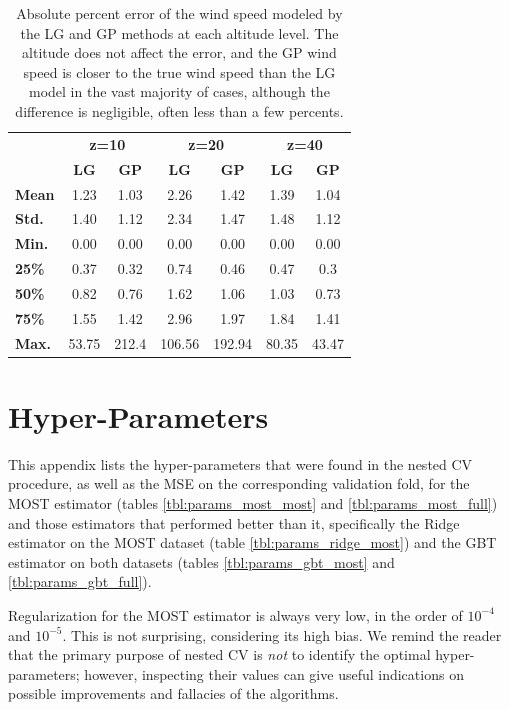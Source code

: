 \documentclass[a4paper,11pt]{kth-mag}
\begin{document}
\begin{table}[]
\centering
\caption{Absolute percent error of the wind speed modeled by the LG and GP methods at each altitude level. The altitude does not affect the error, and the GP wind speed is closer to the true wind speed than the LG model in the vast majority of cases, although the difference is negligible, often less than a few percents.}
\label{tbl:model_wind_errors}
\begin{tabular*}{\textwidth}{l |@{\extracolsep{\fill}} cc|cc|cc}
\toprule
& \multicolumn{2}{c|}{ \textbf{z=10} } & \multicolumn{2}{c|}{ \textbf{z=20 }} & \multicolumn{2}{c}{ \textbf{z=40} } \\
& \textbf{LG} & \textbf{GP} & \textbf{LG} & \textbf{GP} & \textbf{LG} & \textbf{GP} \\
\midrule 
\textbf{Mean} & 1.23 & 1.03 & 2.26 & 1.42 & 1.39 & 1.04 \\
\textbf{Std.} & 1.40 & 1.12 & 2.34 & 1.47 & 1.48 & 1.12 \\
\textbf{Min.} & 0.00 & 0.00 & 0.00 & 0.00 & 0.00 & 0.00 \\
\textbf{25\%} & 0.37 & 0.32 & 0.74 & 0.46 & 0.47 & 0.3  \\
\textbf{50\%} & 0.82 & 0.76 & 1.62 & 1.06 & 1.03 & 0.73 \\
\textbf{75\%} & 1.55 & 1.42 & 2.96 & 1.97 & 1.84 & 1.41 \\
\textbf{Max.} & 53.75 & 212.4 & 106.56 & 192.94 & 80.35 & 43.47 \\
\bottomrule
\end{tabular*} 
\end{table}



\chapter{Hyper-Parameters}
\label{apx:hyps}

This appendix lists the hyper-parameters that were found in the nested CV procedure, as well as the MSE on the corresponding validation fold, for the MOST estimator (tables \ref{tbl:params_most_most} and \ref{tbl:params_most_full}) and those estimators that performed better than it, specifically the Ridge estimator on the MOST dataset (table \ref{tbl:params_ridge_most}) and the GBT estimator on both datasets (tables \ref{tbl:params_gbt_most} and \ref{tbl:params_gbt_full}).

Regularization for the MOST estimator is always very low, in the order of $10^{-4}$ and $10^{-5}$. This is not surprising, considering its high bias. We remind the reader that the primary purpose of nested CV is \emph{not} to identify the optimal hyper-parameters; however, inspecting their values can give useful indications on possible improvements and fallacies of the algorithms.
\end{document}
